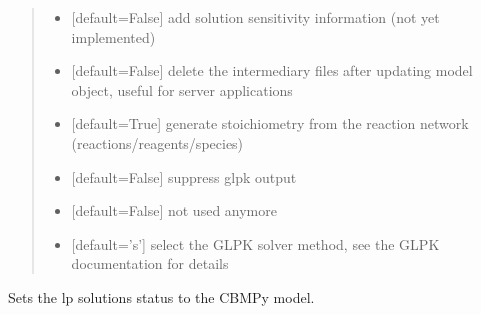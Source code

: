 \documentclass[letterpaper,12pt,english]{sphinxmanual}
\begin{document}
\begin{fulllineitems}
\begin{quote}
\begin{description}
\begin{itemize}
\item {} 
\sphinxAtStartPar
{} \textendash{} {[}default=False{]} add solution sensitivity information (not yet implemented)

\item {} 
\sphinxAtStartPar
{} \textendash{} {[}default=False{]} delete the intermediary files after updating model object, useful for server applications

\item {} 
\sphinxAtStartPar
{} \textendash{} {[}default=True{]} generate stoichiometry from the reaction network (reactions/reagents/species)

\item {} 
\sphinxAtStartPar
{} \textendash{} {[}default=False{]} suppress glpk output

\item {} 
\sphinxAtStartPar
{} \textendash{} {[}default=False{]} not used anymore

\item {} 
\sphinxAtStartPar
{} \textendash{} {[}default=’s’{]} select the GLPK solver method, see the GLPK documentation for details

\end{itemize}

\end{description}\end{quote}

\end{fulllineitems}


\begin{fulllineitems}
\label{\detokenize{api/solvers:cbmpy.CBGLPK.glpk_setSolutionStatusToModel}}
\pysigstartsignatures
\pysiglinewithargsret
{}
{\sphinxparamcomma {}}
{}
\pysigstopsignatures
\sphinxAtStartPar
Sets the lp solutions status to the CBMPy model.

\end{fulllineitems}
\end{document}
